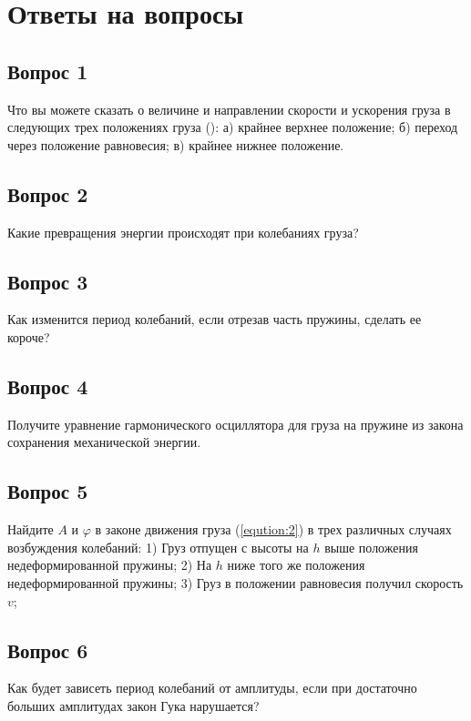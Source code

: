 \section{Ответы на вопросы}

\subsection{Вопрос 1}

Что вы можете сказать о величине и направлении скорости и ускорения груза в следующих трех положениях груза (): а) крайнее верхнее положение; б) переход через положение равновесия; в) крайнее нижнее положение.


\subsection{Вопрос 2}
Какие превращения энергии происходят при колебаниях груза?

\subsection{Вопрос 3}
Как изменится период колебаний, если отрезав часть пружины, сделать ее короче?

\subsection{Вопрос 4}
Получите уравнение гармонического осциллятора для груза на пружине из закона сохранения механической энергии.

\subsection{Вопрос 5}
Найдите $A$ и $\varphi$ в законе движения груза (\ref{eqution:2}) в трех различных случаях возбуждения колебаний: 1) Груз отпущен с высоты на $h$ выше положения недеформированной пружины; 2) На $h$ ниже того же положения недеформированной пружины; 3) Груз в положении равновесия получил скорость $v$;

\subsection{Вопрос 6}
Как будет зависеть период колебаний от амплитуды, если при достаточно больших амплитудах закон Гука нарушается?